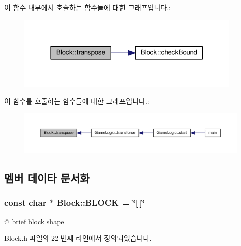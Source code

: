 이 함수 내부에서 호출하는 함수들에 대한 그래프입니다.\+:
\nopagebreak
\begin{figure}[H]
\begin{center}
\leavevmode
\includegraphics[width=307pt]{class_block_a9cc446ec51a125982c41e67af63059b0_cgraph}
\end{center}
\end{figure}




이 함수를 호출하는 함수들에 대한 그래프입니다.\+:
\nopagebreak
\begin{figure}[H]
\begin{center}
\leavevmode
\includegraphics[width=350pt]{class_block_a9cc446ec51a125982c41e67af63059b0_icgraph}
\end{center}
\end{figure}




\subsection{멤버 데이타 문서화}
\subsubsection[{\texorpdfstring{B\+L\+O\+CK}{BLOCK}}]{\setlength{\rightskip}{0pt plus 5cm}const char $\ast$ Block\+::\+B\+L\+O\+CK = \char`\"{}\mbox{[}$\,$\mbox{]}\char`\"{}\hspace{0.3cm}{\ttfamily [static]}}\hypertarget{class_block_a4cb64c2c20884eed68c24c6147f68514}{}\label{class_block_a4cb64c2c20884eed68c24c6147f68514}
@ brief block shape 

Block.\+h 파일의 22 번째 라인에서 정의되었습니다.

